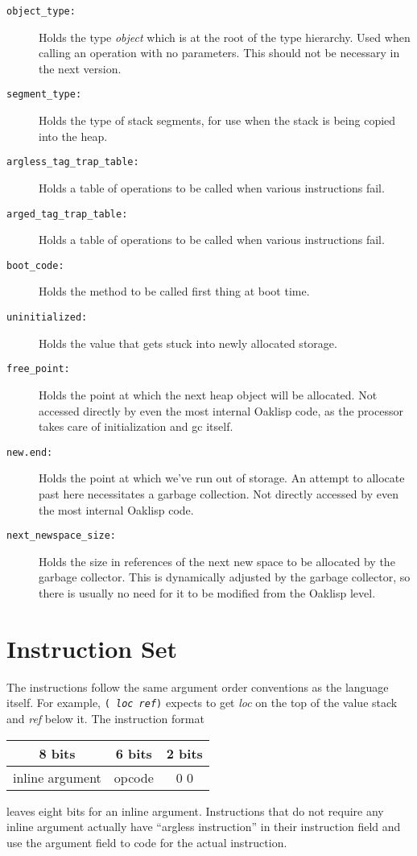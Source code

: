 \begin{description}
\item[\tt object\_type:] Holds the type \emph{object} which is at the root
of the type hierarchy.  Used when calling an operation with no
parameters.  This should not be necessary in the next version.

\item[\tt segment\_type:] Holds the type of stack segments, for use when
the stack is being copied into the heap.

\item[\tt argless\_tag\_trap\_table:] Holds a table of operations to be
called when various instructions fail.

\item[\tt arged\_tag\_trap\_table:] Holds a table of operations to be
called when various instructions fail.

\item[\tt boot\_code:] Holds the method to be called first thing at boot time.

\item[\tt uninitialized:] Holds the value that gets stuck into newly
allocated storage.

\item[\tt free\_point:] Holds the point at which the next heap object will
be allocated.  Not accessed directly by even the most internal Oaklisp
code, as the processor takes care of initialization and gc itself.

\item[\tt new.end:] Holds the point at which we've run out of storage.  An
attempt to allocate past here necessitates a garbage collection.  Not
directly accessed by even the most internal Oaklisp code.

\item[\tt next\_newspace\_size:] Holds the size in references of the
next new space to be allocated by the garbage collector.  This is
dynamically adjusted by the garbage collector, so there is usually no
need for it to be modified from the Oaklisp level.

\end{description}




\section{Instruction Set}
The instructions follow the same argument order conventions as the
language itself.  For example, \texttt{( \emph{loc ref})}
expects to get \emph{loc} on the top of the value stack and \emph{ref}
below it.  The instruction format
\begin{center} \begin{tabular}{|c|c|c|}\hline
 8 bits          & 6 bits & 2 bits \\\hline
 inline argument & opcode & 0 0    \\\hline
\end{tabular} \end{center}
leaves eight bits for an inline argument.  Instructions that do not
require any inline argument actually have ``argless instruction'' in
their instruction field and use the argument field to code for the
actual instruction.

